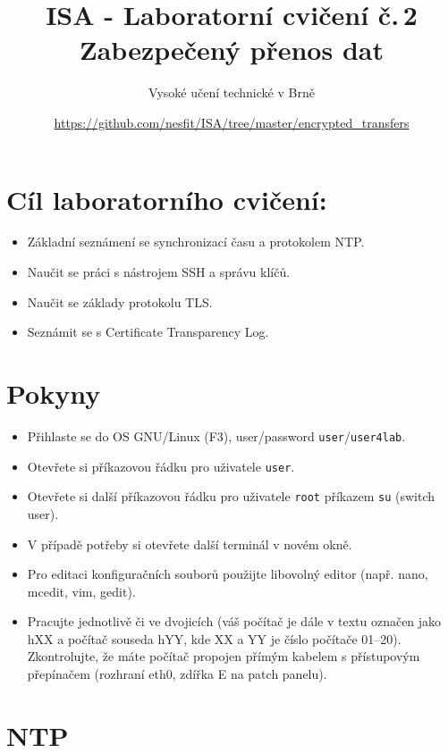 \documentclass[a4paper,11pt]{article}
\title{ISA - Laboratorní cvičení č.\,2\\
{\bf\large Zabezpečený přenos dat}}
\author{Vysoké učení technické v Brně}
\date{\url{https://github.com/nesfit/ISA/tree/master/encrypted_transfers}}
\begin{document}
{\let\newpage\relax\maketitle}

\section*{Cíl laboratorního cvičení:}
\begin{itemize}
  \item Základní seznámení se synchronizací času a protokolem NTP.
  \item Naučit se práci s nástrojem SSH a správu klíčů.
  \item Naučit se základy protokolu TLS.
  \item Seznámit se s Certificate Transparency Log.
\end{itemize}

\section*{Pokyny}
\begin{itemize}
  \item Přihlaste se do OS GNU/Linux (F3), user/password {\tt user}/{\tt user4lab}.
  \item Otevřete si příkazovou řádku pro uživatele {\tt user}.
  \item Otevřete si další příkazovou řádku pro uživatele {\tt root} příkazem {\tt su}
  (switch user).
  \item V případě potřeby si otevřete další terminál v novém okně.
  \item Pro editaci konfiguračních souborů použijte libovolný editor (např.
  nano, mcedit, vim, gedit).
\item Pracujte jednotlivě či ve dvojicích (váš počítač je dále v textu označen jako hXX a
  počítač souseda hYY, kde XX a YY je číslo počítače 01--20). Zkontrolujte, že máte počítač propojen
    přímým kabelem s přístupovým přepínačem (rozhraní eth0, zdířka E na patch
    panelu).
  
\end{itemize}

\newpage
\section{NTP}
\end{document}
